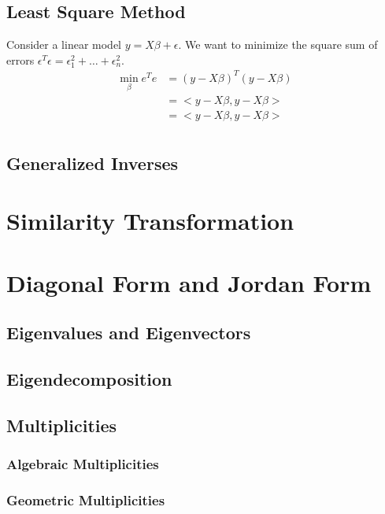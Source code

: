\documentclass{article}
\begin{document}
\subsection{Least Square Method}
Consider a linear model \(y=X\beta +\epsilon\).
We want to minimize the square sum of errors \(\epsilon^T\epsilon=\epsilon_1^2+\dots+\epsilon_n^2\).
\begin{align*}
\min_\beta e^Te &= (y-X\beta)^T(y-X\beta) \\
&= <y-X\beta, y-X\beta> \\
&= <y-X\beta, y-X\beta>\\
\end{align*}

\subsection{Generalized Inverses}

\section{Similarity Transformation}


\section{Diagonal Form and Jordan Form}

\subsection{Eigenvalues and Eigenvectors}

\subsection{Eigendecomposition}

\subsection{Multiplicities}

\subsubsection{Algebraic Multiplicities}

\subsubsection{Geometric Multiplicities}
\end{document}
